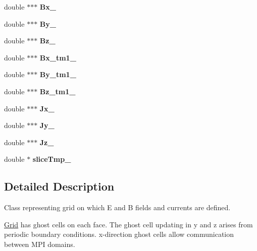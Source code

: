 \begin{DoxyCompactItemize}
\hypertarget{class_grid_af3e410cb198880388039e4a49a9bc55d}{}\label{class_grid_af3e410cb198880388039e4a49a9bc55d} 
double $\ast$$\ast$$\ast$ {\bfseries Bx\+\_\+}
\item 
\hypertarget{class_grid_acbb9cb3b41fbff9958955e92a42efe58}{}\label{class_grid_acbb9cb3b41fbff9958955e92a42efe58} 
double $\ast$$\ast$$\ast$ {\bfseries By\+\_\+}
\item 
\hypertarget{class_grid_ad2cec062b407c6ac77d5aac144c71258}{}\label{class_grid_ad2cec062b407c6ac77d5aac144c71258} 
double $\ast$$\ast$$\ast$ {\bfseries Bz\+\_\+}
\item 
\hypertarget{class_grid_a5310eeec619f3f8ec782fd3a1757d29e}{}\label{class_grid_a5310eeec619f3f8ec782fd3a1757d29e} 
double $\ast$$\ast$$\ast$ {\bfseries Bx\+\_\+tm1\+\_\+}
\item 
\hypertarget{class_grid_a8febeb882155e2d76b15d4279c52698d}{}\label{class_grid_a8febeb882155e2d76b15d4279c52698d} 
double $\ast$$\ast$$\ast$ {\bfseries By\+\_\+tm1\+\_\+}
\item 
\hypertarget{class_grid_a90815801f8c229cfd47da1566b36e57d}{}\label{class_grid_a90815801f8c229cfd47da1566b36e57d} 
double $\ast$$\ast$$\ast$ {\bfseries Bz\+\_\+tm1\+\_\+}
\item 
\hypertarget{class_grid_a8d4ca4b13f4d3963bd8e78c48e527fc8}{}\label{class_grid_a8d4ca4b13f4d3963bd8e78c48e527fc8} 
double $\ast$$\ast$$\ast$ {\bfseries Jx\+\_\+}
\item 
\hypertarget{class_grid_a320132efacf9d773c82a97c2f838cb06}{}\label{class_grid_a320132efacf9d773c82a97c2f838cb06} 
double $\ast$$\ast$$\ast$ {\bfseries Jy\+\_\+}
\item 
\hypertarget{class_grid_ade5d55b0ce8f87a22ce8bf18047486a4}{}\label{class_grid_ade5d55b0ce8f87a22ce8bf18047486a4} 
double $\ast$$\ast$$\ast$ {\bfseries Jz\+\_\+}
\item 
\hypertarget{class_grid_a5dcd38dc5d89c1a2a22af25b34998a63}{}\label{class_grid_a5dcd38dc5d89c1a2a22af25b34998a63} 
double $\ast$ {\bfseries slice\+Tmp\+\_\+}
\end{DoxyCompactItemize}


\subsection{Detailed Description}
Class representing grid on which E and B fields and currents are defined. 

\hyperlink{class_grid}{Grid} has ghost cells on each face. The ghost cell updating in y and z arises from periodic boundary conditions. x-\/direction ghost cells allow communication between M\+PI domains.

